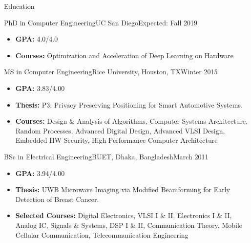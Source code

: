 \begin{cvsection}{Education}
	\begin{cvsubsection}{PhD in Computer Engineering}{UC San Diego}{Expected: Fall 2019}
		\begin{itemize}
			\item \textbf{GPA:} 4.0/4.0
			\item \textbf{Courses:} Optimization and Acceleration of Deep Learning on Hardware
		\end{itemize}
	\end{cvsubsection}	
	\begin{cvsubsection}{MS in Computer Engineering}{Rice University, Houston, TX}{Winter 2015}
		\begin{itemize}
			\item \textbf{GPA:} 3.83/4.00
			\item \textbf{Thesis:} P3: Privacy Preserving Positioning for Smart Automotive Systems.
			\item \textbf{Courses:} Design \& Analysis of Algorithms, Computer Systems Architecture, Random Processes, Advanced Digital Design, Advanced VLSI Design, Embedded HW Security, High Performance Computer Architecture
		\end{itemize}
	\end{cvsubsection}
	\begin{cvsubsection}{BSc in Electrical Engineering}{BUET, Dhaka, Bangladesh}{March 2011}
		\begin{itemize}
			\item \textbf{GPA:} 3.94/4.00
			\item \textbf{Thesis:} UWB Microwave Imaging via Modified Beamforming for Early Detection of Breast Cancer.
			\item \textbf{Selected Courses:} Digital Electronics, VLSI I \& II, Electronics I \& II, Analog IC, Signals \& Systems, DSP I \& II, Communication Theory, Mobile Cellular Communication, Telecommunication Engineering
		\end{itemize}
	\end{cvsubsection}
\end{cvsection} 
